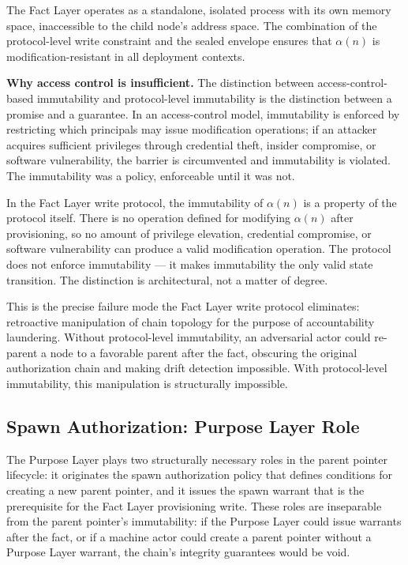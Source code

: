 The Fact Layer operates as a standalone, isolated process with its own memory space, inaccessible to the child node's address space. The combination of the protocol-level write constraint and the sealed envelope ensures that $\alpha(n)$ is modification-resistant in all deployment contexts.

\medskip
\noindent\textbf{Why access control is insufficient.} The distinction between access-control-based immutability and protocol-level immutability is the distinction between a promise and a guarantee. In an access-control model, immutability is enforced by restricting which principals may issue modification operations; if an attacker acquires sufficient privileges through credential theft, insider compromise, or software vulnerability, the barrier is circumvented and immutability is violated. The immutability was a policy, enforceable until it was not.

In the Fact Layer write protocol, the immutability of $\alpha(n)$ is a property of the protocol itself. There is no operation defined for modifying $\alpha(n)$ after provisioning, so no amount of privilege elevation, credential compromise, or software vulnerability can produce a valid modification operation. The protocol does not enforce immutability --- it makes immutability the only valid state transition. The distinction is architectural, not a matter of degree.

This is the precise failure mode the Fact Layer write protocol eliminates: retroactive manipulation of chain topology for the purpose of accountability laundering. Without protocol-level immutability, an adversarial actor could re-parent a node to a favorable parent after the fact, obscuring the original authorization chain and making drift detection impossible. With protocol-level immutability, this manipulation is structurally impossible.

\subsection{Spawn Authorization: Purpose Layer Role}
\label{sec:purpose-layer-authorization}

The Purpose Layer plays two structurally necessary roles in the parent pointer lifecycle: it originates the spawn authorization policy that defines conditions for creating a new parent pointer, and it issues the spawn warrant that is the prerequisite for the Fact Layer provisioning write. These roles are inseparable from the parent pointer's immutability: if the Purpose Layer could issue warrants after the fact, or if a machine actor could create a parent pointer without a Purpose Layer warrant, the chain's integrity guarantees would be void.

